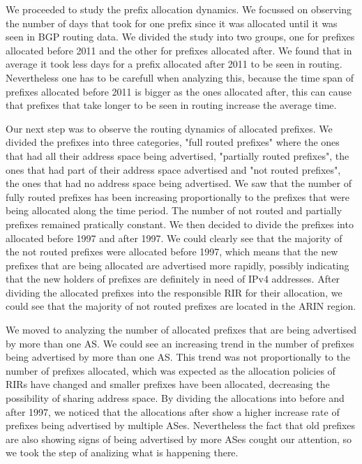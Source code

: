 \documentclass[11pt,a4paper]{scrreprt}
\begin{document}
We proceeded to study the prefix allocation dynamics. We focussed on observing the number of days that took for one prefix since it was allocated until it was seen in BGP routing data. We divided the study into two groups, one for prefixes allocated before 2011 and the other for prefixes allocated after. We found that in average it took less days for a prefix allocated after 2011 to be seen in routing. Nevertheless one has to be carefull when analyzing this, because the time span of prefixes allocated before 2011 is bigger as the ones allocated after, this can cause that prefixes that take longer to be seen in routing increase the average time.

Our next step was to observe the routing dynamics of allocated prefixes. We divided the prefixes into three categories, "full routed prefixes" where the ones that had all their address space being advertised, "partially routed prefixes", the ones that had part of their address space advertised and "not routed prefixes", the ones that had no address space being advertised. We saw that the number of fully routed prefixes has been increasing proportionally to the prefixes that were being allocated along the time period. The number of not routed and partially prefixes remained pratically constant. We then decided to divide the prefixes into allocated before 1997 and after 1997. We could clearly see that the majority of the not routed prefixes were allocated before 1997, which means that the new prefixes that are being allocated are advertised more rapidly, possibly indicating that the new holders of prefixes are definitely in need of IPv4 addresses. After dividing the allocated prefixes into the responsible RIR for their allocation, we could see that the majority of not routed prefixes are located in the ARIN region.

We moved to analyzing the number of allocated prefixes that are being advertised by more than one AS. We could see an increasing trend in the number of prefixes being advertised by more than one AS. This trend was not proportionally to the number of prefixes allocated, which was expected as the allocation policies of RIRs have changed and smaller prefixes have been allocated, decreasing the possibility of sharing address space. By dividing the allocations into before and after 1997, we noticed that the allocations after show a higher increase rate of prefixes being advertised by multiple ASes. Nevertheless the fact that old prefixes are also showing signs of being advertised by more ASes cought our attention, so we took the step of analizing what is happening there.
\end{document}
